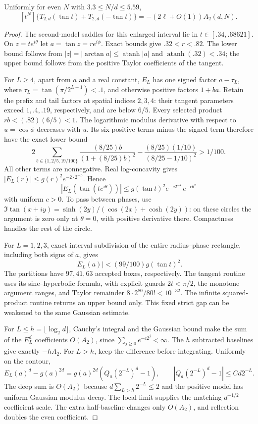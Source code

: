 \documentclass[11pt,a4paper]{article}
\begin{document}
\begin{lemma}\label{lem:T2coef}
Uniformly for even $N$ with $3.3\le N/d\le5.59$,
\[
 [t^N]\{T_{2,d}(\tan t)+T_{2,d}(-\tan t)\}
 =-(2\ell+O(1))A_2(d,N).
\]
\end{lemma}
\begin{proof}
The second-model saddles for this enlarged interval lie in $t\in[.34,.68621]$. On $z=te^{i\theta}$ let $a=\tan z=re^{i\phi}$. Exact bounds give $.32<r<.82$. The lower bound follows from $|z|=|\arctan a|\le\operatorname{atanh}|a|$ and $\operatorname{atanh}(.32)<.34$; the upper bound follows from the positive Taylor coefficients of the tangent.

For $L\ge4$, apart from $a$ and a real constant, $E_L$ has one signed factor $a-\tau_L$, where $\tau_L=\tan(\pi/2^{L+1})<.1$, and otherwise positive factors $1+ba$. Retain the prefix and tail factors at spatial indices $2,3,4$: their tangent parameters exceed $1,.4,.19$, respectively, and are below $6/5$. Every selected product $rb<(.82)(6/5)<1$. The logarithmic modulus derivative with respect to $u=\cos\phi$ decreases with $u$. Its six positive terms minus the signed term therefore have the exact lower bound
\[
 2\sum_{b\in\{1,2/5,19/100\}}\frac{(8/25)b}{(1+(8/25)b)^2}
 -\frac{(8/25)(1/10)}{(8/25-1/10)^2}>1/100.
\]
All other terms are nonnegative. Real log-concavity gives
$|E_L(r)|\le g(r)^2e^{-2\cdot2^{-L}}$. Hence
\[
 |E_L(\tan(te^{i\theta}))|
 \le g(\tan t)^2e^{-c2^{-L}}e^{-c\theta^2}
\]
with uniform $c>0$. To pass between phases, use
$\Im\tan(x+iy)=\sinh(2y)/(\cos(2x)+\cosh(2y))$: on these circles the argument is zero only at $\theta=0$, with positive derivative there. Compactness handles the rest of the circle.

For $L=1,2,3$, exact interval subdivision of the entire radius--phase rectangle, including both signs of $a$, gives
\[
 |E_L(a)|<(99/100)g(\tan t)^2.
\]
The partitions have $97,41,63$ accepted boxes, respectively. The tangent routine uses its sine--hyperbolic formula, with explicit guards $2t<\pi/2$, the monotone argument ranges, and Taylor remainder $8\cdot2^{80}/80!<10^{-32}$. The infinite squared-product routine returns an upper bound only. This fixed strict gap can be weakened to the same Gaussian estimate.

For $L\le h=\lfloor\log_2d\rfloor$, Cauchy's integral and the Gaussian bound make the sum of the $E_L^d$ coefficients $O(A_2)$, since $\sum_{j\ge0}e^{-c2^j}<\infty$. The $h$ subtracted baselines give exactly $-hA_2$.
For $L>h$, keep the difference before integrating. Uniformly on the contour,
\[
 E_L(a)^d-g(a)^{2d}=g(a)^{2d}(Q_a(2^{-L})^d-1),\qquad
 |Q_a(2^{-L})^d-1|\le Cd2^{-L}.
\]
The deep sum is $O(A_2)$ because $d\sum_{L>h}2^{-L}\le2$ and the positive model has uniform Gaussian modulus decay. The local limit supplies the matching $d^{-1/2}$ coefficient scale. The extra half-baseline changes only $O(A_2)$, and reflection doubles the even coefficient.
\end{proof}
\end{document}
